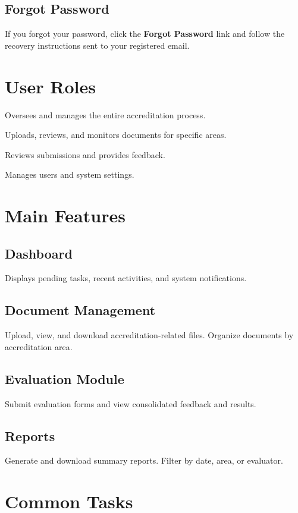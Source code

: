 \documentclass[11pt,a4paper]{article}
\begin{document}
\subsection{Forgot Password}
If you forgot your password, click the \textbf{Forgot Password} link and follow the
recovery instructions sent to your registered email.

\section{User Roles}
\begin{description}[leftmargin=!,labelwidth=3cm]
    \item[Accreditation Coordinator] Oversees and manages the entire accreditation process.
    \item[Area Chair] Uploads, reviews, and monitors documents for specific areas.
    \item[Evaluator] Reviews submissions and provides feedback.
    \item[Admin] Manages users and system settings.
\end{description}

\section{Main Features}
\subsection{Dashboard}
Displays pending tasks, recent activities, and system notifications.

\subsection{Document Management}
Upload, view, and download accreditation-related files. Organize documents by accreditation area.

\subsection{Evaluation Module}
Submit evaluation forms and view consolidated feedback and results.

\subsection{Reports}
Generate and download summary reports. Filter by date, area, or evaluator.

\section{Common Tasks}
\end{document}
